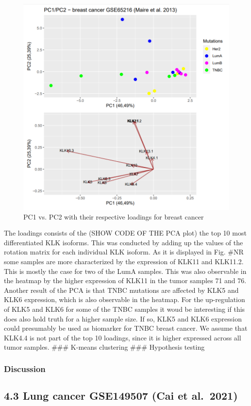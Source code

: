 \documentclass[
]{article}
\begin{document}
\begin{figure}

{\centering \includegraphics[width=0.5\linewidth]{images/PCAplot_breast} 

}

\caption{PC1 vs. PC2 with their respective loadings for breast cancer}\label{fig:PCA plot - breast }
\end{figure}

The loadings consists of the (SHOW CODE OF THE PCA plot) the top 10 most
differentiated KLK isoforms. This was conducted by adding up the values
of the rotation matrix for each individual KLK isoform. As it is
displayed in Fig. \#NR some samples are more characterized by the
expression of KLK11 and KLK11.2. This is mostly the case for two of the
LumA samples. This was also observable in the heatmap by the higher
expression of KLK11 in the tumor samples 71 and 76. Another result of
the PCA is that TNBC mutations are affected by KLK5 and KLK6 expression,
which is also observable in the heatmap. For the up-regulation of KLK5
and KLK6 for some of the TNBC samples it woud be interesting if this
does also hold truth for a higher sample size. If so, KLK5 and KLK6
expression could presumably be used as biomarker for TNBC breast cancer.
We assume that KLK4.4 is not part of the top 10 loadings, since it is
higher expressed across all tumor samples. \#\#\# K-means clustering
\#\#\# Hypothesis testing

\hypertarget{discussion}{%
\subsubsection{Discussion}\label{discussion}}

\hypertarget{lung-cancer-gse149507-cai-et-al.-2021}{%
\subsection{4.3 Lung cancer GSE149507 (Cai et
al.~2021)}\label{lung-cancer-gse149507-cai-et-al.-2021}}
\end{document}
